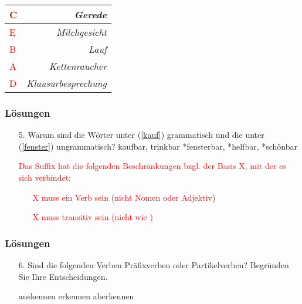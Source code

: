 {\begin{frame}
\begin{table}[h!]
\begin{minipage}{0.4\linewidth}
	\end{minipage}\hfill%
	\begin{minipage}{0.4\linewidth}
		\centering
		\begin{tabular}{|p{}|r|}
			\hline 
			\textcolor{red}{C} & \emph{Gerede} \\
			\hline
			\textcolor{red}{E} & \emph{Milchgesicht}\\
			\hline
			\textcolor{red}{B} & \emph{Lauf} \\
			\hline
			\textcolor{red}{A} & \emph{Kettenraucher}  \\
			\hline
			\textcolor{red}{D} & \emph{Klausurbesprechung}  \\
			\hline 
		\end{tabular}
	\end{minipage}
\end{table}
\end{frame}




\begin{frame}
\frametitle{Lösungen}
\begin{itemize}
	\item[5.] Warum sind die Wörter unter (\ref{kauf}) grammatisch und die unter (\ref{fenster}) ungrammatisch? %
	\eal
	\ex\label{kauf} kaufbar, trinkbar
	\ex\label{fenster} *fensterbar, *helfbar, *schönbar
	\zl
	
	\textcolor{red}{
		Das Suffix  hat die folgenden Beschränkungen bzgl. der Basis X, mit der es sich verbindet:
		\begin{itemize}
			\item[] X muss ein Verb sein (nicht Nomen oder Adjektiv)
			\item[] X muss transitiv sein (nicht wie )
		\end{itemize}
	}
\end{itemize}

\end{frame}


\begin{frame}
\frametitle{Lösungen}
\begin{itemize}
	\item [6.] Sind die folgenden Verben Präfixverben oder Partikelverben? Begründen Sie Ihre Entscheidungen. %
	
	\eal
	\ex auskennen
	\ex erkennen
	\ex aberkennen
	\zl
	

\end{itemize}
\end{frame}}
